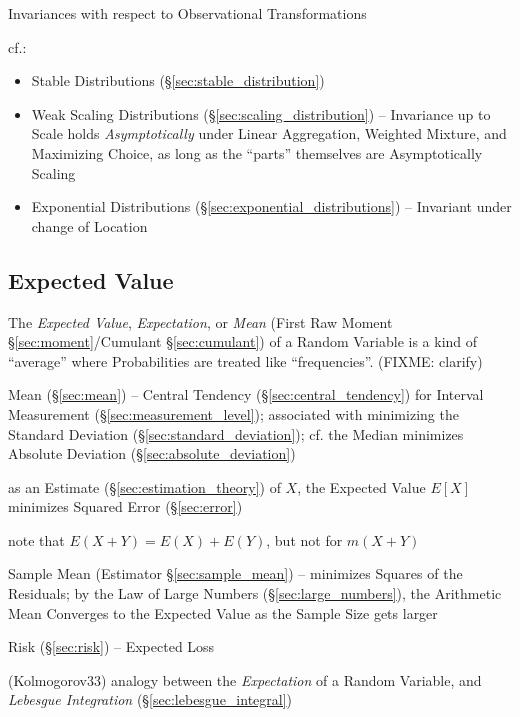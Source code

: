 Invariances with respect to Observational Transformations

cf.:
\begin{itemize}
  \item Stable Distributions (\S\ref{sec:stable_distribution})
  \item Weak Scaling Distributions (\S\ref{sec:scaling_distribution}) --
    Invariance up to Scale holds \emph{Asymptotically} under Linear Aggregation,
    Weighted Mixture, and Maximizing Choice, as long as the ``parts'' themselves
    are Asymptotically Scaling
  \item Exponential Distributions (\S\ref{sec:exponential_distributions}) --
    Invariant under change of Location
\end{itemize}



\subsection{Expected Value}\label{sec:expected_value}

The \emph{Expected Value}, \emph{Expectation}, or \emph{Mean} (First Raw Moment
\S\ref{sec:moment}/Cumulant \S\ref{sec:cumulant}) of a Random Variable is a kind
of ``average'' where Probabilities are treated like ``frequencies''. (FIXME:
clarify)

\fist Mean (\S\ref{sec:mean}) -- Central Tendency (\S\ref{sec:central_tendency})
for Interval Measurement (\S\ref{sec:measurement_level}); associated with
minimizing the Standard Deviation (\S\ref{sec:standard_deviation}); cf. the
Median minimizes Absolute Deviation (\S\ref{sec:absolute_deviation})

as an Estimate (\S\ref{sec:estimation_theory}) of $X$, the Expected Value $E[X]$
minimizes Squared Error (\S\ref{sec:error})

note that $E(X + Y) = E(X) + E(Y)$, but not for $m(X+Y)$

\fist Sample Mean (Estimator \S\ref{sec:sample_mean}) -- minimizes Squares of
the Residuals;
by the Law of Large Numbers (\S\ref{sec:large_numbers}), the Arithmetic Mean
Converges to the Expected Value as the Sample Size gets larger

\fist Risk (\S\ref{sec:risk}) -- Expected Loss

(Kolmogorov33) analogy between the \emph{Expectation} of a Random Variable, and
\emph{Lebesgue Integration} (\S\ref{sec:lebesgue_integral})

